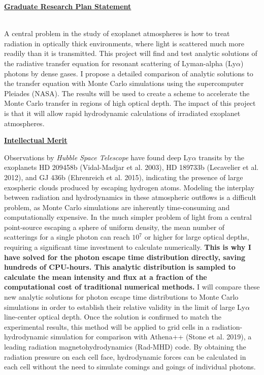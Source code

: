 \documentclass[11pt]{article}
\title{\vspace{-1.5in}}
\author{}
\date{}
\begin{document}
\maketitle

\thispagestyle{empty}
\centerline{\underline{\textbf{Graduate Research Plan Statement}}}

\noindent
\\ A central problem in the study of exoplanet atmospheres is how to treat radiation in optically thick environments, where light is scattered much more readily than it is transmitted. This project will find and test analytic solutions of the radiative transfer equation for resonant scattering of Lyman-alpha (Ly$\alpha$) photons by dense gases. I propose a detailed comparison of analytic solutions to the transfer equation with Monte Carlo simulations using the supercomputer Pleiades (NASA). The results will be used to create a scheme to accelerate the Monte Carlo transfer in regions of high optical depth. The impact of this project is that it will allow rapid hydrodynamic calculations of irradiated exoplanet atmospheres.

\noindent \textbf{\underline{Intellectual Merit}} 

Observations by \textit{Hubble Space Telescope} have found deep Ly$\alpha$ transits by the exoplanets HD 209458b (Vidal-Madjar et al. 2003), HD 189733b (Lecavelier et al. 2012), and  GJ 436b (Ehrenreich et al. 2015), indicating the presence of large exospheric clouds produced by escaping hydrogen atoms. Modeling the interplay between radiation and hydrodynamics in these atmospheric outflows is a difficult problem, as Monte Carlo simulations are inherently time-consuming and computationally expensive. In the much simpler problem of light from a central point-source escaping a sphere of uniform density, the mean number of scatterings for a single photon can reach $10^{7}$ or higher for large optical depths, requiring a significant time investment to calculate numerically. \textbf{This is why I have solved for the photon escape time distribution directly, saving hundreds of CPU-hours. This analytic distribution is sampled to calculate the mean intensity and flux at a fraction of the computational cost of traditional numerical methods.} I will compare these new analytic solutions for photon escape time distributions to Monte Carlo simulations in order to establish their relative validity in the limit of large Ly$\alpha$ line-center optical depth. Once the solution is confirmed to match the experimental results, this method will be applied to grid cells in a radiation-hydrodynamic simulation for comparison with Athena++ (Stone et al. 2019), a leading radiation magnetohydrodynamics (Rad-MHD) code. By obtaining the radiation pressure on each cell face, hydrodynamic forces can be calculated in each cell without the need to simulate comings and goings of individual photons.
\end{document}

